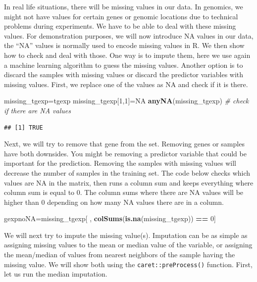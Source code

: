 \documentclass[12pt,]{krantz}
\newenvironment{Shaded}{\begin{snugshade}}{\end{snugshade}}
\newcommand{\CommentTok}[1]{\textcolor[rgb]{0.56,0.35,0.01}{\textit{#1}}}
\newcommand{\DecValTok}[1]{\textcolor[rgb]{0.00,0.00,0.81}{#1}}
\newcommand{\KeywordTok}[1]{\textcolor[rgb]{0.13,0.29,0.53}{\textbf{#1}}}
\newcommand{\NormalTok}[1]{#1}
\newcommand{\OperatorTok}[1]{\textcolor[rgb]{0.81,0.36,0.00}{\textbf{#1}}}
\newcommand{\OtherTok}[1]{\textcolor[rgb]{0.56,0.35,0.01}{#1}}
\newcommand{\StringTok}[1]{\textcolor[rgb]{0.31,0.60,0.02}{#1}}
\begin{document}
In real life situations, there will be missing values in our data. In genomics, we might not have values for certain genes or genomic locations due to technical problems during experiments. We have to be able to deal with these missing values. For demonstration purposes, we will now introduce NA values in our data, the ``NA'' values is normally used to encode missing values in R. We then show how to check and deal with those. One way is to impute them, here we use again a machine learning algorithm to guess the missing values. Another option is to discard the samples with missing values or discard the predictor variables with missing values. First, we replace one of the values as NA and check if it is there.

\begin{Shaded}
\begin{Highlighting}[]
\NormalTok{missing_tgexp=tgexp}
\NormalTok{missing_tgexp[}\DecValTok{1}\NormalTok{,}\DecValTok{1}\NormalTok{]=}\OtherTok{NA}
\KeywordTok{anyNA}\NormalTok{(missing_tgexp) }\CommentTok{# check if there are NA values}
\end{Highlighting}
\end{Shaded}

\begin{verbatim}
## [1] TRUE
\end{verbatim}

Next, we will try to remove that gene from the set. Removing genes or samples have both downsides. You might be removing a predictor variable that could be important for the prediction. Removing the samples with missing values will decrease the number of samples in the training set. The code below checks which values are NA in the matrix, then runs a column sum and keeps everything where column sum is equal to 0. The column sums where there are NA values will be higher than 0 depending on how many NA values there are in a column.

\begin{Shaded}
\begin{Highlighting}[]
\NormalTok{gexpnoNA=missing_tgexp[ , }\KeywordTok{colSums}\NormalTok{(}\KeywordTok{is.na}\NormalTok{(missing_tgexp)) }\OperatorTok{==}\StringTok{ }\DecValTok{0}\NormalTok{]}
\end{Highlighting}
\end{Shaded}

We will next try to impute the missing value(s). Imputation can be as simple as assigning missing values to the mean or median value of the variable, or assigning the mean/median of values from nearest neighbors of the sample having the missing value. We will show both using the \texttt{caret::preProcess()} function. First, let us run the median imputation.
\end{document}
